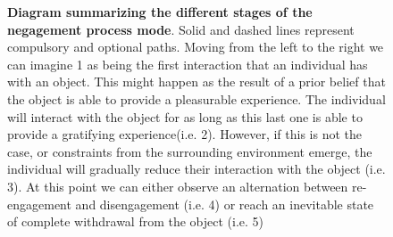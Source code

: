 \begin{figure}[h]
\begin{center}
\begin{adjustbox}{width=\textwidth}
\end{adjustbox}
\end{center}
\caption{\textbf{Diagram summarizing the different stages of the negagement process mode}.  Solid and dashed lines represent compulsory and  optional paths. Moving from the left to the right we can imagine 1 as being the first interaction that an individual has with an object. This might happen as the result of a prior belief that the object is able to provide a pleasurable experience. The individual will interact with the object for as long as this last one is able to provide a gratifying experience(i.e. 2). However, if this is not the case, or constraints from the surrounding environment emerge, the individual will gradually reduce their interaction with the object (i.e. 3). At this point we can either observe an alternation between re-engagement and disengagement (i.e. 4) or reach an inevitable state of complete withdrawal from the object (i.e. 5)}
\label{fig: eng_proc_model_1}
\end{figure}